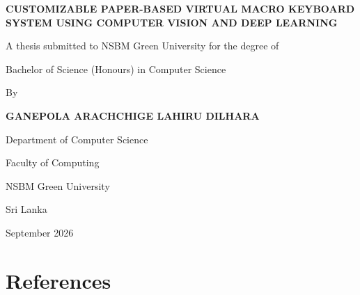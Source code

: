 \documentclass[12pt,a4paper]{report}
\begin{document}
\begin{center}
{\fontsize{16pt}{24pt}\selectfont \textbf{CUSTOMIZABLE PAPER-BASED VIRTUAL MACRO KEYBOARD SYSTEM USING COMPUTER VISION AND DEEP LEARNING} \par}
\vfill
{\fontsize{14pt}{20pt}\selectfont A thesis submitted to NSBM Green University for the degree of \par}
{\fontsize{14pt}{20pt}\selectfont Bachelor of Science (Honours) in Computer Science \par}
\vfill
{\fontsize{14pt}{20pt}\selectfont By \par}
\vfill
{\fontsize{14pt}{20pt}\selectfont \textbf{GANEPOLA ARACHCHIGE LAHIRU DILHARA} \par}
\vfill
{\fontsize{14pt}{20pt}\selectfont Department of Computer Science \par}
{\fontsize{14pt}{20pt}\selectfont Faculty of Computing \par}
{\fontsize{14pt}{20pt}\selectfont NSBM Green University \par}
{\fontsize{14pt}{20pt}\selectfont Sri Lanka \par}
\vfill
{\fontsize{14pt}{20pt}\selectfont September 2026 \par}
\end{center}

\pagebreak


\pagebreak

\pagebreak

\pagebreak

\pagebreak


\pagebreak

\pagebreak

\pagebreak

\pagebreak

\pagebreak

\pagebreak

\chapter*{References}
\printbibliography

\pagebreak


\pagebreak

\pagebreak

\pagebreak

\pagebreak

\end{document}

